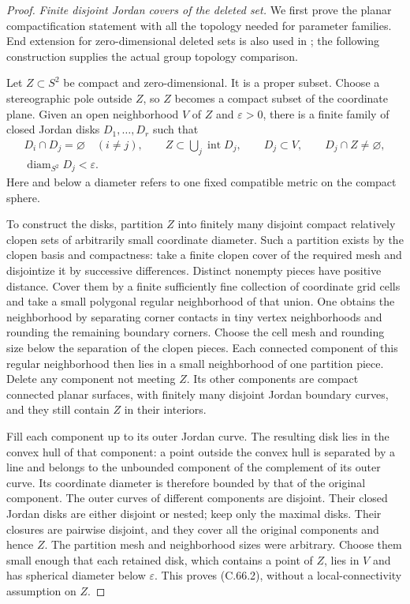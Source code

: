 \begin{proof}
\emph{Finite disjoint Jordan covers of the deleted set.}
We first prove the planar compactification statement
with all the topology needed for parameter families.
End extension for zero-dimensional deleted sets is
also used in \cite[Proposition~1.5 and Appendix~A.1]
{C_BeguinCrovisierLeRoux2020}; the following construction
supplies the actual group topology comparison.

Let $Z\subset S^2$ be compact and zero-dimensional.
It is a proper subset. Choose a stereographic pole
outside $Z$, so $Z$ becomes a compact subset of the
coordinate plane. Given an open neighborhood $V$ of
$Z$ and $\varepsilon>0$, there is a finite family
of closed Jordan disks $D_1,\ldots,D_r$ such that
\[
 \begin{gathered}
 D_i\cap D_j=\varnothing\quad(i\ne j),\qquad
 Z\subset\bigcup_j\operatorname{int}D_j,\qquad
 D_j\subset V,\qquad D_j\cap Z\ne\varnothing,\\
              \operatorname{diam}_{S^2}D_j<\varepsilon .
 \end{gathered}                                         \tag{C.66.2}
\]
Here and below a diameter refers to one fixed compatible
metric on the compact sphere.

To construct the disks, partition $Z$ into finitely
many disjoint compact relatively clopen sets of
arbitrarily small coordinate diameter. Such a partition
exists by the clopen basis and compactness: take a finite
clopen cover of the required mesh and disjointize it by
successive differences. Distinct nonempty pieces have
positive distance. Cover them by a finite sufficiently
fine collection of coordinate grid cells and take a
small polygonal regular neighborhood of that union.
One obtains the neighborhood by separating corner
contacts in tiny vertex neighborhoods and rounding
the remaining boundary corners. Choose the cell mesh
and rounding size below the separation of the clopen
pieces. Each connected component of this regular
neighborhood then lies in a small neighborhood of one
partition piece. Delete any component not meeting $Z$.
Its other components are compact connected planar
surfaces, with finitely many disjoint Jordan boundary
curves, and they still contain $Z$ in their interiors.

Fill each component up to its outer Jordan curve.
The resulting disk lies in the convex hull of that
component: a point outside the convex hull is separated
by a line and belongs to the unbounded component of
the complement of its outer curve. Its coordinate
diameter is therefore bounded by that of the original
component. The outer curves of different components
are disjoint. Their closed Jordan disks are either
disjoint or nested; keep only the maximal disks.
Their closures are pairwise disjoint, and they cover
all the original components and hence $Z$.
The partition mesh and neighborhood sizes were arbitrary.
Choose them small enough that each retained disk,
which contains a point of $Z$, lies in $V$ and has
spherical diameter below $\varepsilon$. This proves
(C.66.2), without a local-connectivity assumption on $Z$.


\end{proof}
